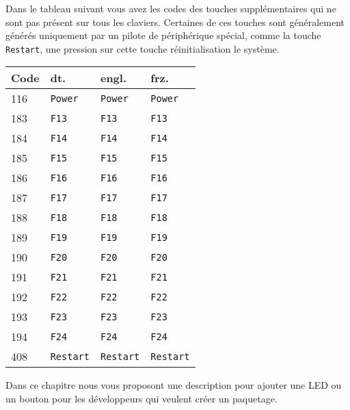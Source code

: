 Dans le tableau suivant vous avez les codes des touches supplémentaires qui ne sont pas
présent sur tous les claviers. Certaines de ces touches sont généralement générés
uniquement par un pilote de périphérique spécial, comme la touche \texttt{Restart}, une
pression sur cette touche réinitialisation le système.

\begin{longtable}{|l|l|l|l|}
  \hline
  \textbf{Code} & \textbf{dt.} & \textbf{engl.} & \textbf{frz.} \\
  \endhead
  \hline
  116 & \texttt{Power} & \texttt{Power} & \texttt{Power} \\ \hline
  183 & \texttt{F13} & \texttt{F13} & \texttt{F13} \\ \hline
  184 & \texttt{F14} & \texttt{F14} & \texttt{F14} \\ \hline
  185 & \texttt{F15} & \texttt{F15} & \texttt{F15} \\ \hline
  186 & \texttt{F16} & \texttt{F16} & \texttt{F16} \\ \hline
  187 & \texttt{F17} & \texttt{F17} & \texttt{F17} \\ \hline
  188 & \texttt{F18} & \texttt{F18} & \texttt{F18} \\ \hline
  189 & \texttt{F19} & \texttt{F19} & \texttt{F19} \\ \hline
  190 & \texttt{F20} & \texttt{F20} & \texttt{F20} \\ \hline
  191 & \texttt{F21} & \texttt{F21} & \texttt{F21} \\ \hline
  192 & \texttt{F22} & \texttt{F22} & \texttt{F22} \\ \hline
  193 & \texttt{F23} & \texttt{F23} & \texttt{F23} \\ \hline
  194 & \texttt{F24} & \texttt{F24} & \texttt{F24} \\ \hline
  408 & \texttt{Restart} & \texttt{Restart} & \texttt{Restart} \\ \hline
\end{longtable}

  Dans ce chapitre nous vous proposont une description pour ajouter une LED ou un bouton
  pour les développeurs qui veulent créer un paquetage\footnotemark.


